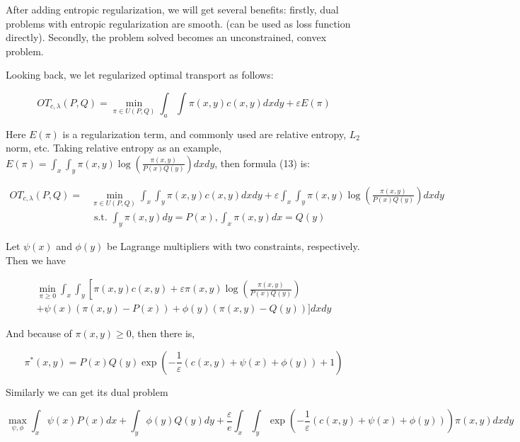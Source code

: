 After adding entropic regularization, we will get several benefits: firstly, dual problems with entropic regularization are smooth. (can be used as loss function directly). Secondly, the problem solved becomes an unconstrained, convex problem.

Looking back, we let regularized optimal transport as follows:

\begin{equation}
  O T_{c, \lambda}(P, Q)=\min _{\pi \in U(P, Q)} \int_{a} \int \pi(x, y) c(x, y) d x d y+\varepsilon E(\pi)
\end{equation}

Here $E(\pi)$ is a regularization term, and commonly used are relative entropy, $L_2$ norm, etc. Taking relative entropy as an example, $E(\pi)=\int_{x} \int_{y} \pi(x, y) \log \left(\frac{\pi(x, y)}{P(x) Q(y)}\right) d x d y$, then formula (13) is:

\begin{equation}
\begin{aligned} O T_{c, \lambda}(P, Q)=& \min _{\pi \in U(P, Q)} \int_{x} \int_{y} \pi(x, y) c(x, y) d x d y+\varepsilon \int_{x} \int_{y} \pi(x, y) \log \left(\frac{\pi(x, y)}{P(x) Q(y)}\right) d x d y \\ & \text { s.t. } \int_{y} \pi(x, y) d y=P(x), \int_{x} \pi(x, y) d x=Q(y) \end{aligned}
\end{equation}

  Let $\psi(x)$ and $\phi(y)$ be Lagrange multipliers with two constraints, respectively. Then we have

\begin{equation}
\begin{array}{l}{\min _{\pi \geq 0} \int_{x} \int_{y}\left[\pi(x, y) c(x, y)+\varepsilon \pi(x, y) \log \left(\frac{\pi(x, y)}{P(x) Q(y)}\right)\right.} \\ {+\psi(x)(\pi(x, y)-P(x))+\phi(y)(\pi(x, y)-Q(y))] d x d y}\end{array}
\end{equation}

  And because of $\pi(x,y) \geq 0$, then there is,

  \begin{equation}
    \pi^{*}(x, y)=P(x) Q(y) \exp \left(-\frac{1}{\varepsilon}(c(x, y)+\psi(x)+\phi(y))+1\right)
  \end{equation}

  Similarly we can get its dual problem

  \begin{equation}
  \max _{\psi, \phi} \int_{x} \psi(x) P(x) d x+\int_{y} \phi(y) Q(y) d y+\frac{\varepsilon}{e} \int_{x} \int_{y} \exp \left(-\frac{1}{\varepsilon}(c(x, y)+\psi(x)+\phi(y))\right) \pi(x, y) d x d y
\end{equation}